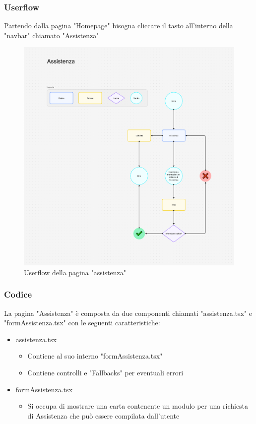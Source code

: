 \documentclass{report}
\begin{document}
\subsubsection*{Userflow}
Partendo dalla pagina "Homepage" bisogna cliccare il tasto all'interno della "navbar" chiamato "Assistenza"
\begin{figure}[H]
	\centering\includegraphics[width=1\textwidth]{images/microservizio-home/frontend/assistenza-userflow.png}
	Userflow della pagina "assistenza"
\end{figure}

\subsubsection*{Codice}
La pagina "Assistenza" è composta da due componenti chiamati "assistenza.tsx" e "formAssistenza.tsx" con le seguenti caratteristiche:
\begin{itemize}
	\item assistenza.tsx
	\begin{itemize}
		\item Contiene al suo interno "formAssistenza.tsx"
		\item Contiene controlli e "Fallbacks" per eventuali errori
	\end{itemize}
	\item formAssistenza.tsx
	\begin{itemize}
		\item Si occupa di mostrare una carta contenente un modulo per una richiesta di Assistenza che può essere compilata dall'utente
	\end{itemize}
\end{itemize}
\end{document}
